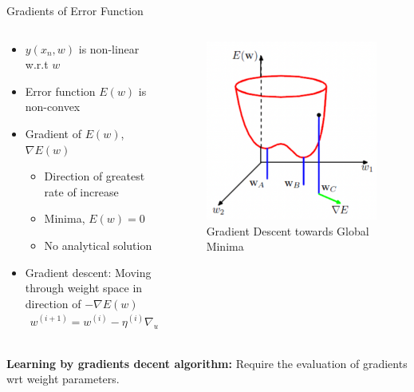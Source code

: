 \documentclass[10pt, hyperref={colorlinks = true,linkcolor = blue}]{beamer}
\begin{document}
{{{\begin{frame}{Gradients of Error Function}
\begin{columns}
        \begin{column}{0.6\textwidth}
\begin{itemize}
    \item $y(x_n, w)$ is non-linear w.r.t $w$
    \item Error function $E(w)$ is non-convex
    \item Gradient of $E(w)$, $\nabla E(w)$
    \begin{itemize}
        \item Direction of greatest rate of increase
        \item Minima, $E( w) = 0$
        \item No analytical solution
    \end{itemize}
    \item Gradient descent: Moving through weight space in direction of $-\nabla E( w)$
    \begin{align*}
        w^{(i +1)} = w^{(i)} - \eta^{(i)} \nabla_w E( w^{i}).
    \end{align*}
\end{itemize}
\end{column}
 \begin{column}{0.4\textwidth}
\begin{figure}
    \includegraphics[width=\linewidth]{figures/GlobalMinima}
    \caption{Gradient Descent towards Global Minima}
\end{figure}
\end{column}
\end{columns}
\textbf{Learning by gradients decent algorithm:} Require the evaluation of gradients wrt weight parameters.
\end{frame}


}}}
\end{document}

